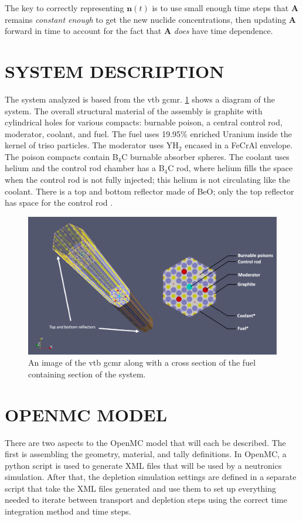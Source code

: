 \documentclass[letterpaper]{physor2024}
\begin{document}
The key to correctly representing $\textbf{n}(t)$ is to use small enough time steps that $\textbf{A}$ remains \textit{constant enough} to get the new nuclide concentrations, then updating $\textbf{A}$ forward in time to account for the fact that $\textbf{A}$ \textit{does} have time dependence.

\section{SYSTEM DESCRIPTION}\label{sec:system}
The system analyzed is based from the \gls{vtb} \gls{gcmr}. \cref{fig:vtb_gcmr} shows a diagram of the system. The overall structural material of the assembly is graphite with cylindrical holes for various compacts: burnable poison, a central control rod, moderator, coolant, and fuel. The fuel uses 19.95\% enriched Uranium inside the kernel of \gls{triso} particles. The moderator uses YH$_{2}$ encased in a FeCrAl envelope. The poison compacts contain B$_{4}$C burnable absorber spheres. The coolant uses helium and the control rod chamber has a B$_{4}$C rod, where helium fills the space when the control rod is not fully injected; this helium is not circulating like the coolant. There is a top and bottom reflector made of BeO; only the top reflector has space for the control rod \cite{Abdelhameed-ANS-2022}.
\begin{figure}[h]
    \centering
    \includegraphics[width=0.75\linewidth]{figures/vtb_gcmr_diagram.jpg}
    \caption{An image of the \gls{vtb} \gls{gcmr} along with a cross section of the fuel containing section of the system.}
    \label{fig:vtb_gcmr}
\end{figure}
\section{OPENMC MODEL}\label{sec:openmc_model}
There are two aspects to the OpenMC model that will each be described. The first is assembling the geometry, material, and tally definitions. In OpenMC, a python script is used to generate XML files that will be used by a neutronics simulation. After that, the depletion simulation settings are defined in a separate script that take the XML files generated and use them to set up everything needed to iterate between transport and depletion steps using the correct time integration method and time steps.
\end{document}
